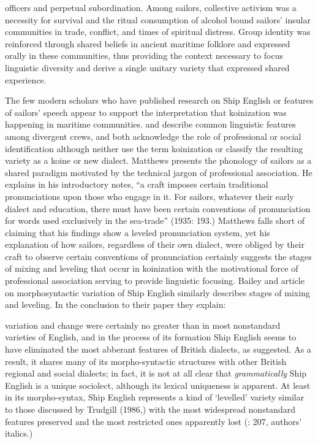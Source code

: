 officers and perpetual subordination. Among sailors, collective activism was a necessity for survival and the ritual consumption of alcohol bound sailors’ insular communities in trade, conflict, and times of spiritual distress. Group identity was reinforced through shared beliefs in ancient maritime folklore and expressed orally in these communities, thus providing the context necessary to focus linguistic diversity and derive a single unitary variety that expressed shared experience. 

\begin{styleNormali}
The few modern scholars who have published research on Ship English or features of sailors’ speech appear to support the interpretation that koinization was happening in maritime communities. \citet{Matthews1935} and \citet{BaileyRoss1988} describe common linguistic features among divergent crews, and both acknowledge the role of professional or social identification although neither use the term koinization or classify the resulting variety as a koine or new dialect. Matthews presents the phonology of sailors as a shared paradigm motivated by the technical jargon of professional association. He explains in his introductory notes, “a craft imposes certain traditional pronunciations upon those who engage in it. For sailors, whatever their early dialect and education, there must have been certain conventions of pronunciation for words used exclusively in the sea-trade” (1935: 193.) Matthews falls short of claiming that his findings show a leveled pronunciation system, yet his explanation of how sailors, regardless of their own dialect, were obliged by their craft to observe certain conventions of pronunciation certainly suggests the stages of mixing and leveling that occur in koinization with the motivational force of professional association serving to provide linguistic focusing. Bailey and  article on morphosyntactic variation of Ship English similarly describes stages of mixing and leveling. In the conclusion to their paper they explain: 
\end{styleNormali}

variation and change were certainly no greater than in most nonstandard varieties of English, and in the process of its formation Ship English seems to have eliminated the most abberant features of British dialects, as \citet{Hancock1976} suggested. As a result, it shares many of its morpho-syntactic structures with other British regional and social dialects; in fact, it is not at all clear that \textit{grammatically} Ship English is a unique sociolect, although its lexical uniqueness is apparent. At least in its morpho-syntax, Ship English represents a kind of ‘levelled’ variety similar to those discussed by Trudgill (1986,) with the most widespread nonstandard features preserved and the most restricted ones apparently lost (\citealt{BaileyRoss1988}: 207, authors’ italics.) 

